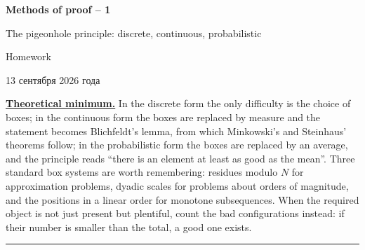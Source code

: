 \documentclass[11pt,a4paper]{article}
\newcommand{\head}[1]{\par\medskip\noindent\textbf{\underline{#1}}\quad}
\begin{document}
\begin{center}
{\huge\bfseries Methods of proof -- 1\par}\vspace{1.2em}
{\Large The pigeonhole principle: discrete, continuous, probabilistic\par}\vspace{0.8em}
{\Large Homework\par}\vspace{0.8em}
{\foreignlanguage{russian}{13 сентября 2026 года}\par}
\end{center}\vspace{0.5em}

\head{Theoretical minimum.} In the discrete form the only difficulty is the choice of boxes; in
the continuous form the boxes are replaced by measure and the statement becomes Blichfeldt's
lemma, from which Minkowski's and Steinhaus' theorems follow; in the probabilistic form the
boxes are replaced by an average, and the principle reads ``there is an element at least as
good as the mean''. Three standard box systems are worth remembering: residues modulo $N$ for
approximation problems, dyadic scales for problems about orders of magnitude, and the positions
in a linear order for monotone subsequences. When the required object is not just present but
plentiful, count the bad configurations instead: if their number is smaller than the total, a
good one exists.

\medskip\noindent\rule{\linewidth}{0.4pt}
\end{document}
